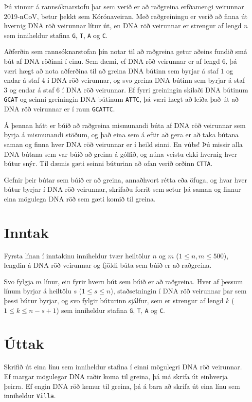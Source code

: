 %
Þú vinnur á rannsóknarstofu þar sem verið er að raðgreina erfðamengi veirunnar
2019-nCoV, betur þekkt sem Kórónaveiran. Með raðgreiningu er verið að finna út
hvernig DNA röð veirunnar lítur út, en DNA röð veirunnar er strengur af lengd
$n$ sem inniheldur stafina \texttt{G}, \texttt{T}, \texttt{A} og \texttt{C}.

Aðferðin sem rannsóknarstofan þín notar til að raðgreina getur aðeins fundið
smá bút af DNA röðinni í einu. Sem dæmi, ef DNA röð veirunnar er af lengd $6$,
þá væri hægt að nota aðferðina til að greina DNA bútinn sem byrjar á staf $1$
og endar á staf $4$ í DNA röð veirunnar, og svo greina DNA bútinn sem byrjar á
staf $3$ og endar á staf $6$ í DNA röð veirunnar. Ef fyrri greiningin skilaði
DNA bútinum \texttt{GCAT} og seinni greiningin DNA bútinum \texttt{ATTC}, þá
væri hægt að leiða það út að DNA röð veirunnar er í raun \texttt{GCATTC}.

Á þennan hátt er búið að raðgreina mismunandi búta af DNA röð veirunnar sem
byrja á mismunandi stöðum, og það eina sem á eftir að gera er að taka bútana
saman og finna hver DNA röð veirunnar er í heild sinni. En vúbs! Þú missir alla
DNA bútana sem var búið að greina á gólfið, og núna veistu ekki hvernig hver
bútur snýr. Til dæmis gæti seinni búturinn að ofan verið orðinn \texttt{CTTA}.

Gefnir þeir bútar sem búið er að greina, annaðhvort rétta eða öfuga, og hvar
hver bútur byrjar í DNA röð veirunnar, skrifaðu forrit sem setur þá saman og
finnur eina mögulega DNA röð sem gæti komið til greina.

\section*{Inntak}
Fyrsta línan í inntakinu inniheldur tvær heiltölur $n$ og $m$ ($1 \leq n, m \leq
500$), lengdin á DNA röð veirunnar og fjöldi búta sem búið er að raðgreina.

Svo fylgja $m$ línur, ein fyrir hvern bút sem búið er að raðgreina. Hver af
þessum línum byrjar á heiltölu $s$ ($1 \leq s \leq n$), staðsetningin í DNA röð
veirunnar þar sem þessi bútur byrjar, og svo fylgir búturinn sjálfur, sem er
strengur af lengd $k$ ($1\leq k \leq n-s+1$) sem inniheldur stafina \texttt{G},
\texttt{T}, \texttt{A} og \texttt{C}.

\section*{Úttak}
Skrifið út eina línu sem inniheldur stafina í einni mögulegri DNA röð
veirunnar. Ef margar mögulegar DNA raðir koma til greina, þá má skrifa út
einhverja þeirra. Ef engin DNA röð kemur til greina, þá á bara að skrifa út
eina línu sem inniheldur \texttt{Villa}.

